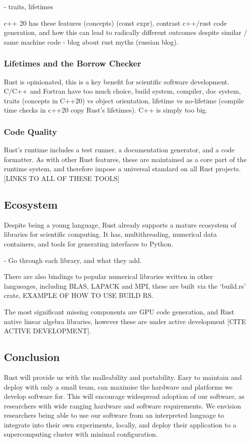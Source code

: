 - traits, lifetimes

c++ 20 has these features (concepts) (const expr), contrast c++/rust code generation, and how this can lead to radically different outcomes despite similar / same machine code - blog about rust myths (russian blog).

\subsubsection*{Lifetimes and the Borrow Checker}
Rust is opinionated, this is a key benefit for scientific software development. C/C++ and Fortran have too much choice, build system, compiler, doc system, traits (concepts in C++20) vs object orientation, lifetime vs no-lifetime (compile time checks in c++20 copy Rust's lifetimes). C++ is simply too big.

\subsubsection*{Code Quality}
Rust's runtime includes a test runner, a documentation generator, and a code formatter. As with other Rust features, these are maintained as a core part of the runtime system, and therefore impose a universal standard on all Rust projects. [LINKS TO ALL OF THESE TOOLS]

\subsection*{Ecosystem}

Despite being a young language, Rust already supports a mature ecosystem of libraries for scientific computing. It has, multithreading, numerical data containers, and tools for generating interfaces to Python. 

- Go through each library, and what they add.

There are also bindings to popular numerical libraries written in other langueages, including BLAS, LAPACK and MPI, these are built via the `build.rs' crate, EXAMPLE OF HOW TO USE BUILD RS.

The most significant missing components are GPU code generation, and Rust native linear algebra libraries, however these are under active development [CITE ACTIVE DEVELOPMENT].

\subsection*{Conclusion}
Rust will provide us with the malleability and portability. Easy to maintain and deploy with only a small team, can maximise the hardware and platforms we develop software for. This will encourage widespread adoption of our software, as researchers with wide ranging hardware and software requirements. We envision researchers being able to use our software from an interpreted language to integrate into their own experiments, locally, and deploy their application to a supercomputing cluster with minimal configuration.
